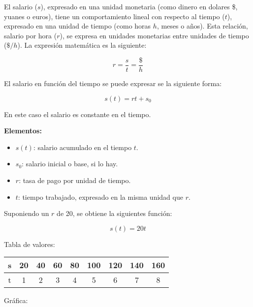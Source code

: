 El salario ($s$), expresado en una unidad monetaria (como dinero en dolares \$, yuanes o euros), tiene un comportamiento lineal con respecto al tiempo ($t$), expresado en una unidad de tiempo (como horas $h$, meses o años). Esta relación, salario por hora ($r$), se expresa en unidades monetarias entre unidades de tiempo ($\$/h$). La expresión matemática es la siguiente:

\[
  r = \dfrac{s}{t} = \dfrac{\$}{h}
\]

El salario en función del tiempo se puede expresar se la siguiente forma:

\[\boxed{
  s(t) = rt + s_0
}\]

En este caso el salario es constante en el tiempo.

\textbf{Elementos:}

\begin{itemize}
  \item $s(t)$: salario acumulado en el tiempo $t$.
  \item $s_0$: salario inicial o base, si lo hay.
  \item $r$: tasa de pago por unidad de tiempo.
  \item $t$: tiempo trabajado, expresado en la misma unidad que $r$.
\end{itemize}

Suponiendo un $r$ de 20, se obtiene la siguientes función:

\[
  s(t) = 20t
\]

Tabla de valores:

\begin{center}
\begin{tabular}{|c|c|c|c|c|c|c|c|c|}
  \hline
  s & 20 & 40 & 60 & 80 & 100 & 120 & 140 & 160 \\
  \hline
  t & 1 & 2 & 3 & 4 & 5 & 6 & 7 & 8 \\
  \hline
\end{tabular}
\end{center}

Gráfica:

